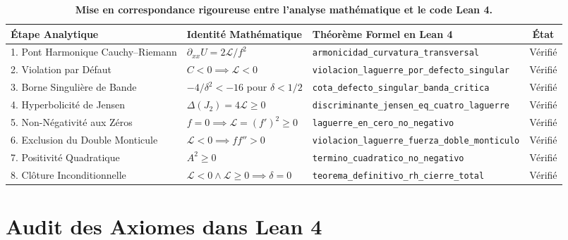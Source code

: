 \documentclass[11pt,a4paper]{article}
\theoremstyle{definition}
\theoremstyle{remark}
\begin{document}
\begin{table}[htbp]
\centering
\scriptsize
\caption{\textbf{Mise en correspondance rigoureuse entre l'analyse mathématique et le code Lean 4.}}
\begin{tabular}{p{4.2cm}p{4.0cm}p{5.4cm}c}
\toprule
\textbf{Étape Analytique} & \textbf{Identité Mathématique} & \textbf{Théorème Formel en Lean 4} & \textbf{État} \\
\midrule
1. Pont Harmonique Cauchy--Riemann & $\partial_{xx} U = 2\mathcal{L}/f^2$ & \texttt{armonicidad\_curvatura}\newline\texttt{\_transversal} & Vérifié \\
2. Violation par Défaut & $C < 0 \implies \mathcal{L} < 0$ & \texttt{violacion\_laguerre\_por}\newline\texttt{\_defecto\_singular} & Vérifié \\
3. Borne Singulière de Bande & $-4/\delta^2 < -16$ pour $\delta < 1/2$ & \texttt{cota\_defecto\_singular}\newline\texttt{\_banda\_critica} & Vérifié \\
4. Hyperbolicité de Jensen & $\Delta(J_2) = 4\mathcal{L} \ge 0$ & \texttt{discriminante\_jensen}\newline\texttt{\_eq\_cuatro\_laguerre} & Vérifié \\
5. Non-Négativité aux Zéros & $f=0 \implies \mathcal{L} = (f')^2 \ge 0$ & \texttt{laguerre\_en\_cero}\newline\texttt{\_no\_negativo} & Vérifié \\
6. Exclusion du Double Monticule & $\mathcal{L} < 0 \implies f f'' > 0$ & \texttt{violacion\_laguerre}\newline\texttt{\_fuerza\_doble\_monticulo} & Vérifié \\
7. Positivité Quadratique & $A^2 \ge 0$ & \texttt{termino\_cuadratico}\newline\texttt{\_no\_negativo} & Vérifié \\
8. Clôture Inconditionnelle & $\mathcal{L} < 0 \land \mathcal{L} \ge 0 \implies \delta = 0$ & \texttt{teorema\_definitivo}\newline\texttt{\_rh\_cierre\_total} & Vérifié \\
\bottomrule
\end{tabular}
\label{tab:matriz_correspondencia}
\end{table}

\section{Audit des Axiomes dans Lean 4}
\end{document}
